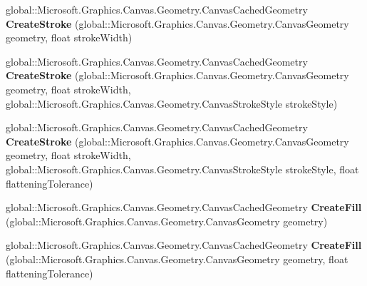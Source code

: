 \begin{DoxyCompactItemize}
global\+::\+Microsoft.\+Graphics.\+Canvas.\+Geometry.\+Canvas\+Cached\+Geometry {\bfseries Create\+Stroke} (global\+::\+Microsoft.\+Graphics.\+Canvas.\+Geometry.\+Canvas\+Geometry geometry, float stroke\+Width)
\item 
\mbox{\label{interface_microsoft_1_1_graphics_1_1_canvas_1_1_geometry_1_1_i_canvas_cached_geometry_statics_a468aa4e2b6369a93bc595faa4775ecd3}} 
global\+::\+Microsoft.\+Graphics.\+Canvas.\+Geometry.\+Canvas\+Cached\+Geometry {\bfseries Create\+Stroke} (global\+::\+Microsoft.\+Graphics.\+Canvas.\+Geometry.\+Canvas\+Geometry geometry, float stroke\+Width, global\+::\+Microsoft.\+Graphics.\+Canvas.\+Geometry.\+Canvas\+Stroke\+Style stroke\+Style)
\item 
\mbox{\label{interface_microsoft_1_1_graphics_1_1_canvas_1_1_geometry_1_1_i_canvas_cached_geometry_statics_af2be06fab26ecb06f7f43abc6c9f7a87}} 
global\+::\+Microsoft.\+Graphics.\+Canvas.\+Geometry.\+Canvas\+Cached\+Geometry {\bfseries Create\+Stroke} (global\+::\+Microsoft.\+Graphics.\+Canvas.\+Geometry.\+Canvas\+Geometry geometry, float stroke\+Width, global\+::\+Microsoft.\+Graphics.\+Canvas.\+Geometry.\+Canvas\+Stroke\+Style stroke\+Style, float flattening\+Tolerance)
\item 
\mbox{\label{interface_microsoft_1_1_graphics_1_1_canvas_1_1_geometry_1_1_i_canvas_cached_geometry_statics_a16df585fb0ca36d40ef89871533acc2a}} 
global\+::\+Microsoft.\+Graphics.\+Canvas.\+Geometry.\+Canvas\+Cached\+Geometry {\bfseries Create\+Fill} (global\+::\+Microsoft.\+Graphics.\+Canvas.\+Geometry.\+Canvas\+Geometry geometry)
\item 
\mbox{\label{interface_microsoft_1_1_graphics_1_1_canvas_1_1_geometry_1_1_i_canvas_cached_geometry_statics_af902923a82387d578dcc6b4a2ac54662}} 
global\+::\+Microsoft.\+Graphics.\+Canvas.\+Geometry.\+Canvas\+Cached\+Geometry {\bfseries Create\+Fill} (global\+::\+Microsoft.\+Graphics.\+Canvas.\+Geometry.\+Canvas\+Geometry geometry, float flattening\+Tolerance)
\item 

\end{DoxyCompactItemize}
